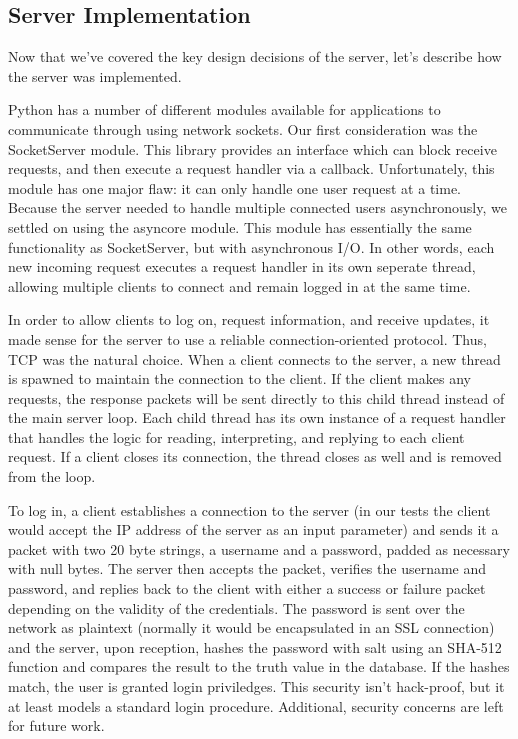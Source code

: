 \subsection{Server Implementation}
Now that we've covered the key design decisions of the server, let's describe how the server
was implemented.

Python has a number of different modules available for applications to communicate
through using network sockets. Our first consideration was the SocketServer module. This 
library
provides an interface which can block receive requests, and then execute a request
handler via a callback. Unfortunately, this module has one major flaw: it can only handle
one user request at a time. Because the server needed to handle multiple connected users
asynchronously, we settled on using the asyncore module. This module has essentially
the same functionality as SocketServer, but with asynchronous I/O. In other words, each
new incoming request executes a request handler in its own seperate thread, allowing 
multiple clients to connect and remain logged in at the same time.

In order to allow clients to log on, request information, and receive updates, it made
sense for the server to use a reliable connection-oriented protocol. Thus, TCP was the 
natural
choice. When a client connects to the server, a new thread is spawned to maintain
the connection to the client. If the client makes any requests, the response packets will 
be sent
directly to this child thread instead of the main server loop. Each child thread has its own
instance of a request handler that handles the logic for reading, interpreting, and replying
to each client request. If a client closes its connection, the thread closes as well and is
removed from the loop. 

To log in, a client establishes a connection to the server (in our tests
the client would accept the IP address of the server as an input parameter) and sends it
a packet with two 20 byte strings, a username and a password, padded as necessary with
null bytes. The server then accepts the packet, verifies the username and password, and
replies back to the client with either a success or failure packet depending on the
validity of the credentials. The password is sent over the network as plaintext (normally
it would be encapsulated in an SSL connection) and the server, upon reception, hashes
the password with salt using an SHA-512 function and compares the result to the truth value 
in the database. If the hashes match, the user is granted login priviledges. This
security isn't hack-proof, but it at least models a standard login procedure.  Additional,
security concerns are left for future work.

